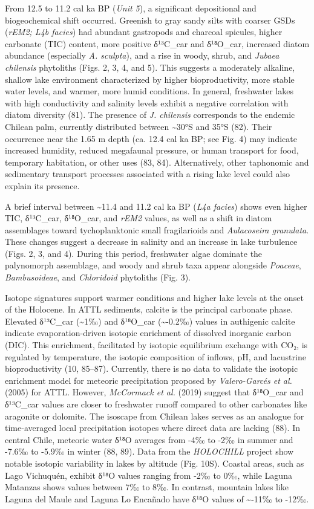 \documentclass[
]{article}
\begin{document}
From 12.5 to 11.2 cal ka BP (\emph{Unit 5}), a significant depositional
and biogeochemical shift occurred. Greenish to gray sandy silts with
coarser GSDs (\emph{rEM2; L4b facies}) had abundant gastropods and
charcoal spicules, higher carbonate (TIC) content, more positive
δ¹³C\_car and δ¹⁸O\_car, increased diatom abundance (especially \emph{A.
sculpta}), and a rise in woody, shrub, and \emph{Jubaea chilensis}
phytoliths (Figs. 2, 3, 4, and 5). This suggests a moderately alkaline,
shallow lake environment characterized by higher bioproductivity, more
stable water levels, and warmer, more humid conditions. In general,
freshwater lakes with high conductivity and salinity levels exhibit a
negative correlation with diatom diversity (81). The presence of
\emph{J. chilensis} corresponds to the endemic Chilean palm, currently
distributed between \textasciitilde30°S and 35°S (82). Their occurrence
near the 1.65 m depth (ca. 12.4 cal ka BP; see Fig. 4) may indicate
increased humidity, reduced megafaunal pressure, or human transport for
food, temporary habitation, or other uses (83, 84). Alternatively, other
taphonomic and sedimentary transport processes associated with a rising
lake level could also explain its presence.

A brief interval between \textasciitilde11.4 and 11.2 cal ka BP
(\emph{L4a facies}) shows even higher TIC, δ¹³C\_car, δ¹⁸O\_car, and
\emph{rEM2} values, as well as a shift in diatom assemblages toward
tychoplanktonic small fragilarioids and \emph{Aulacoseira granulata}.
These changes suggest a decrease in salinity and an increase in lake
turbulence (Figs. 2, 3, and 4). During this period, freshwater algae
dominate the palynomorph assemblage, and woody and shrub taxa appear
alongside \emph{Poaceae}, \emph{Bambusoideae}, and \emph{Chloridoid}
phytoliths (Fig. 3).

Isotope signatures support warmer conditions and higher lake levels at
the onset of the Holocene. In ATTL sediments, calcite is the principal
carbonate phase. Elevated δ¹³C\_car (\textasciitilde1‰) and δ¹⁸O\_car
(\textasciitilde-0.2‰) values in authigenic calcite indicate
evaporation-driven isotopic enrichment of dissolved inorganic carbon
(DIC). This enrichment, facilitated by isotopic equilibrium exchange
with CO₂, is regulated by temperature, the isotopic composition of
inflows, pH, and lacustrine bioproductivity (10, 85--87). Currently,
there is no data to validate the isotopic enrichment model for meteoric
precipitation proposed by \emph{Valero-Garcés et al.} (2005) for ATTL.
However, \emph{McCormack et al.} (2019) suggest that δ¹⁸O\_car and
δ¹³C\_car values are closer to freshwater runoff compared to other
carbonates like aragonite or dolomite. The isoscape from Chilean lakes
serves as an analogue for time-averaged local precipitation isotopes
where direct data are lacking (88). In central Chile, meteoric water
δ¹⁸O averages from -4‰ to -2‰ in summer and -7.6‰ to -5.9‰ in winter
(88, 89). Data from the \emph{HOLOCHILL} project show notable isotopic
variability in lakes by altitude (Fig. 10S). Coastal areas, such as Lago
Vichuquén, exhibit δ¹⁸O values ranging from -2‰ to 0‰, while Laguna
Matanzas shows values between 7‰ to 8‰. In contrast, mountain lakes like
Laguna del Maule and Laguna Lo Encañado have δ¹⁸O values of
\textasciitilde-11‰ to -12‰.
\end{document}
